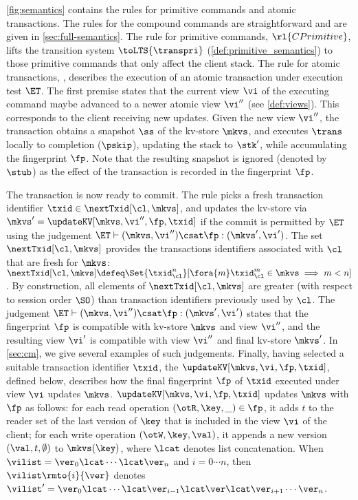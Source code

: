 \cref{fig:semantics} contains the rules for primitive commands and atomic transactions.  
The rules for the compound commands are straightforward and are given in \cref{sec:full-semantics}.
The rule for primitive commands, $\rl{CPrimitive}$, lifts the transition system 
$\toLTS{\transpri}$ (\cref{def:primitive_semantics}) to those primitive commands that only affect the client stack. 
The rule for atomic transactions, , describes the execution of an atomic 
transaction under execution test $\ET$.  
The first premise
states that the current view $\vi$ of the executing command maybe advanced to a newer atomic view $\vi''$ (see \cref{def:views}). 
This corresponds to the client receiving new updates.
Given the new view $\vi''$, the transaction obtains a snapshot $\ss$ of the kv-store $\mkvs$, 
and executes $\trans$ locally to completion ($\pskip$), updating the stack to $\stk'$, while accumulating the fingerprint $\fp$. 
Note that the resulting snapshot is ignored (denoted by $\stub$) as the effect of the transaction is recorded in the fingerprint $\fp$. 
%

The transaction is now ready to commit. The rule picks a fresh transaction identifier $\txid \in \nextTxid[\cl, \mkvs]$, 
and updates the kv-store via $\mkvs' = \updateKV[\mkvs, \vi'', \fp, \txid]$
if the commit is permitted by $\ET$ using the judgement $\ET \vdash (\mkvs, \vi'') \csat \fp : (\mkvs', \vi')$.
The set $\nextTxid[\cl, \mkvs]$ provides the transactions identifiers
associated with $\cl$ that are fresh for  $\mkvs$:
\(
\nextTxid[\cl, \mkvs] \defeq 
\Set{\txid_{\cl}^{n}}[%
\fora{m} \txid_{\cl}^{m} \in \mkvs \implies m < n ]
\).
By construction, all elements of $\nextTxid[\cl, \mkvs]$ are greater (with respect to session order $\SO$) 
than transaction identifiers previously used by $\cl$. 
The judgement $\ET \vdash (\mkvs, \vi'') \csat \fp : (\mkvs', \vi')$
states that the fingerprint $\fp$ is compatible with kv-store $\mkvs$
and view $\vi''$, and the resulting view $\vi'$ 
is compatible with view \( \vi'' \) and final kv-store \( \mkvs' \).
In \cref{sec:cm}, we give several examples of such judgements.
Finally, having selected a suitable transaction identifier $\txid$,
the $\updateKV[\mkvs, \vi, \fp, \txid]$, defined below, describes how the final fingerprint $\fp$ of $\txid$ executed 
under view $\vi$ updates $\mkvs$.
$\updateKV[\mkvs, \vi, \fp, \txid]$ updates $\mkvs$ with $\fp$ as follows: 
for each read operation $(\otR, \key, \_) \in \fp$, it adds $t$ 
to the reader set of the last version of $\key$ that is included in the view $\vi$ of the client; 
for each write operation $(\otW, \key, \val)$, it appends a new version $(\val, t, \emptyset)$ 
to $\mkvs(\key)$, where $\lcat$ denotes list concatenation.
When $\vilist = \ver_0 \lcat \cdots \lcat \ver_n$ and $i=0 \cdots n$, 
then $\vilist\rmto{i}{\ver}$ denotes 
$\vilist' = \ver_0 \lcat \cdots \lcat \ver_{i-1} \lcat \ver \lcat \ver_{i+1} \cdots \ver_{n}$. 

